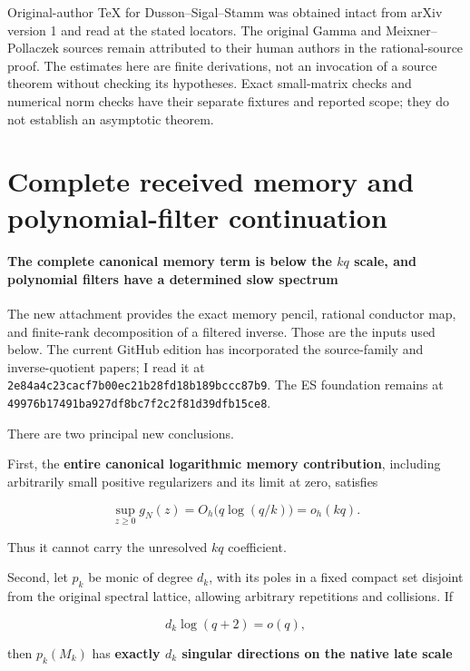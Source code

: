 \documentclass[11pt]{article}
\begin{document}
Original-author TeX for Dusson--Sigal--Stamm was obtained intact from arXiv version 1 and read at the stated locators. The original Gamma and Meixner--Pollaczek sources remain attributed to their human authors in the rational-source proof. The estimates here are finite derivations, not an invocation of a source theorem without checking its hypotheses. Exact small-matrix checks and numerical norm checks have their separate fixtures and reported scope; they do not establish an asymptotic theorem.


\clearpage\part{Complete received memory and polynomial-filter continuation}
\subsection{\texorpdfstring{The complete canonical memory term is below the \(kq\) scale, and polynomial filters have a determined slow spectrum}{The complete canonical memory term is below the kq scale, and polynomial filters have a determined slow spectrum}}\label{the-complete-canonical-memory-term-is-below-the-kq-scale-and-polynomial-filters-have-a-determined-slow-spectrum}

The new attachment provides the exact memory pencil, rational conductor map, and finite-rank decomposition of a filtered inverse. Those are the inputs used below. The current GitHub edition has incorporated the source-family and inverse-quotient papers; I read it at \nolinkurl{2e84a4c23cacf7b00ec21b28fd18b189bccc87b9}. The ES foundation remains at \nolinkurl{49976b17491ba927df8bc7f2c2f81d39dfb15ce8}.

There are two principal new conclusions.

First, the \textbf{entire canonical logarithmic memory contribution}, including arbitrarily small positive regularizers and its limit at zero, satisfies

\[
\boxed{\sup_{z\ge0}g_N(z)=O_h\!\bigl(q\log(q/k)\bigr)=o_h(kq).}
\tag{1}
\]

Thus it cannot carry the unresolved \(kq\) coefficient.

Second, let \(p_k\) be monic of degree \(d_k\), with its poles in a fixed compact set disjoint from the original spectral lattice, allowing arbitrary repetitions and collisions. If

\[
d_k\log(q+2)=o(q),
\]

then \(p_k(M_k)\) has \textbf{exactly \(d_k\) singular directions on the native late scale}
\end{document}
